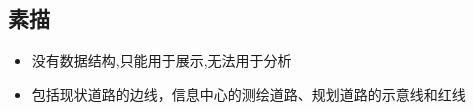 \documentclass{beamerthemeMono}
\begin{document}
\subsection{素描}
\begin{frame}[t]{\subsecname}
\begin{itemize}
\item 没有数据结构,只能用于展示,无法用于分析
\item 包括现状道路的边线，信息中心的测绘道路、规划道路的示意线和红线
\end{itemize} 

\begin{overlayarea}{\textwidth}{\textheight}
\end{overlayarea}
\end{frame}
\end{document}
